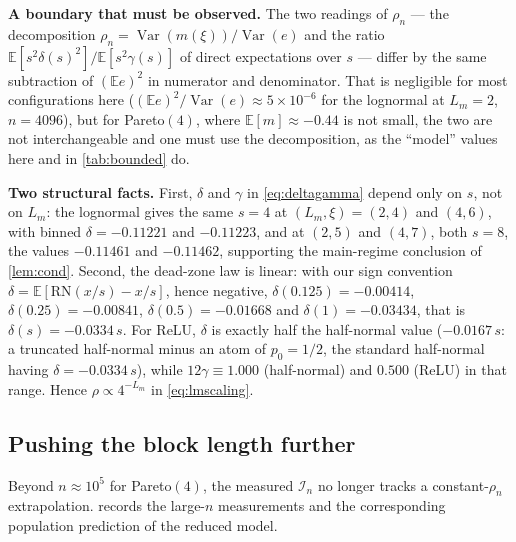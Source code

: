 \documentclass[twocolumn,review,hidelinks,oneeqnum,onetabnum,onefignum,onethmnum]{siamart251216}
\begin{document}
\medskip
\noindent\textbf{A boundary that must be observed.} The two readings of $\rho_n$
--- the decomposition $\rho_n=\operatorname{Var}(m(\xi))/\operatorname{Var}(e)$
and the ratio $\mathbb E[s^2\delta(s)^2]/\mathbb E[s^2\gamma(s)]$ of direct
expectations over $s$ --- differ by the same subtraction of $(\mathbb E e)^2$ in
numerator and denominator. That is negligible for most configurations here
($(\mathbb E e)^2/\operatorname{Var}(e)\approx5\times10^{-6}$ for the lognormal at
$L_m=2$, $n=4096$), but for Pareto$(4)$, where
$\mathbb E[m]\approx-0.44$ is not small, the two are not interchangeable and one
must use the decomposition, as the ``model'' values here and in
\cref{tab:bounded} do.

\medskip
\noindent\textbf{Two structural facts.} First, $\delta$ and $\gamma$ in
\cref{eq:deltagamma} depend only on $s$, not on $L_m$: the lognormal gives the
same $s=4$ at $(L_m,\xi)=(2,4)$ and $(4,6)$, with binned
$\delta=-0.11221$ and $-0.11223$, and at $(2,5)$ and $(4,7)$, both $s=8$, the
values $-0.11461$ and $-0.11462$, supporting the main-regime conclusion of
\cref{lem:cond}. Second, the dead-zone law is linear: with our sign convention
$\delta=\mathbb{E}[\mathrm{RN}(x/s)-x/s]$, hence negative,
$\delta(0.125)=-0.00414$, $\delta(0.25)=-0.00841$, $\delta(0.5)=-0.01668$ and
$\delta(1)=-0.03434$, that is $\delta(s)=-0.0334\,s$. For ReLU, $\delta$ is
exactly half the half-normal value ($-0.0167\,s$: a truncated half-normal minus
an atom of $p_0=1/2$, the standard half-normal having
$\delta=-0.0334\,s$), while $12\gamma\equiv1.000$ (half-normal) and
$0.500$ (ReLU) in that range. Hence $\rho\propto4^{-L_m}$ in
\cref{eq:lmscaling}.

\subsection{Pushing the block length further}
\label{sec:inflbig}

Beyond $n\approx10^5$ for Pareto$(4)$, the measured $\mathcal I_n$ no longer
tracks a constant-$\rho_n$ extrapolation.  records the large-$n$
measurements and the corresponding population prediction of the reduced model.
\end{document}
